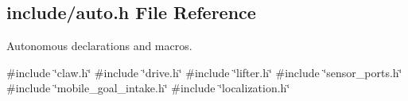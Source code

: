 \subsection{include/auto.h File Reference}
\label{a00002}


Autonomous declarations and macros.  


{\ttfamily \#include \char`\"{}claw.\+h\char`\"{}}\newline
{\ttfamily \#include \char`\"{}drive.\+h\char`\"{}}\newline
{\ttfamily \#include \char`\"{}lifter.\+h\char`\"{}}\newline
{\ttfamily \#include \char`\"{}sensor\+\_\+ports.\+h\char`\"{}}\newline
{\ttfamily \#include \char`\"{}mobile\+\_\+goal\+\_\+intake.\+h\char`\"{}}\newline
{\ttfamily \#include \char`\"{}localization.\+h\char`\"{}}\newline
